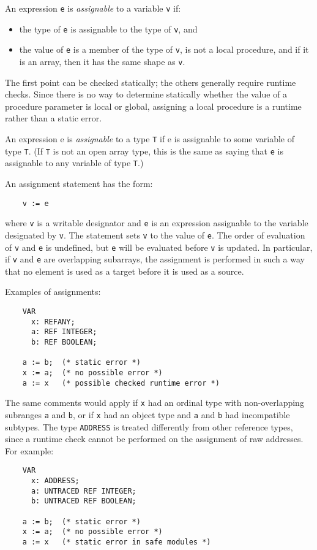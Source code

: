 \documentclass[10pt]{article}
\begin{document}
An expression \verb|e| is \emph{assignable} to a variable \verb|v| if:
\begin{itemize}
\item the type of \verb|e| is assignable to the type of \verb|v|, and
\item the value of \verb|e| is a member of the type of \verb|v|, is not a
  local procedure, and if it is an array, then it has the same shape as
  \verb|v|.
\end{itemize}

The first point can be checked statically; the others generally require
runtime checks.  Since there is no way to determine statically whether the
value of a procedure parameter is local or global, assigning a local procedure
is a runtime rather than a static error.

An expression e is \emph{assignable} to a type \verb|T| if e is assignable to
some variable of type \verb|T|.  (If \verb|T| is not an open array type, this
is the same as saying that \verb|e| is assignable to any variable of type
\verb|T|.)

An assignment statement has the form:
\begin{verbatim}
    v := e
\end{verbatim}
where \verb|v| is a writable designator and \verb|e| is an expression
assignable to the variable designated by \verb|v|.  The statement sets
\verb|v| to the value of \verb|e|.  The order of evaluation of \verb|v| and
\verb|e| is undefined, but \verb|e| will be evaluated before \verb|v| is
updated.  In particular, if \verb|v| and \verb|e| are overlapping subarrays,
the assignment is performed in such a way that no element is used as a target
before it is used as a source.

Examples of assignments:
\begin{verbatim}
    VAR
      x: REFANY;
      a: REF INTEGER;
      b: REF BOOLEAN;

    a := b;  (* static error *)
    x := a;  (* no possible error *)
    a := x   (* possible checked runtime error *)
\end{verbatim}

The same comments would apply if \verb|x| had an ordinal type with
non-overlapping subranges \verb|a| and \verb|b|, or if \verb|x| had an object
type and \verb|a| and \verb|b| had incompatible subtypes.  The type
\verb|ADDRESS| is treated differently from other reference types, since a
runtime check cannot be performed on the assignment of raw addresses.  For
example:
\begin{verbatim}
    VAR
      x: ADDRESS;
      a: UNTRACED REF INTEGER;
      b: UNTRACED REF BOOLEAN;

    a := b;  (* static error *)
    x := a;  (* no possible error *)
    a := x   (* static error in safe modules *)
\end{verbatim}
\end{document}
